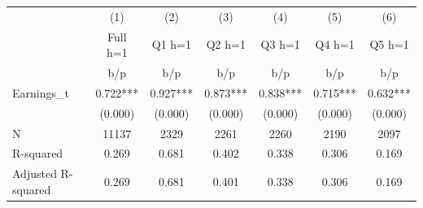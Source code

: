 {
\def\sym#1{\ifmmode^{#1}\else\(^{#1}\)\fi}
\begin{tabular}{l*{6}{c}}
\hline\hline
                    &\multicolumn{1}{c}{(1)}&\multicolumn{1}{c}{(2)}&\multicolumn{1}{c}{(3)}&\multicolumn{1}{c}{(4)}&\multicolumn{1}{c}{(5)}&\multicolumn{1}{c}{(6)}\\
                    &\multicolumn{1}{c}{Full h=1}&\multicolumn{1}{c}{Q1 h=1}&\multicolumn{1}{c}{Q2 h=1}&\multicolumn{1}{c}{Q3 h=1}&\multicolumn{1}{c}{Q4 h=1}&\multicolumn{1}{c}{Q5 h=1}\\
                    &         b/p   &         b/p   &         b/p   &         b/p   &         b/p   &         b/p   \\
\hline
Earnings\_t          &       0.722***&       0.927***&       0.873***&       0.838***&       0.715***&       0.632***\\
                    &     (0.000)   &     (0.000)   &     (0.000)   &     (0.000)   &     (0.000)   &     (0.000)   \\
\hline
N                   &       11137   &        2329   &        2261   &        2260   &        2190   &        2097   \\
R-squared           &       0.269   &       0.681   &       0.402   &       0.338   &       0.306   &       0.169   \\
Adjusted R-squared  &       0.269   &       0.681   &       0.401   &       0.338   &       0.306   &       0.169   \\
\hline\hline
\end{tabular}
}
